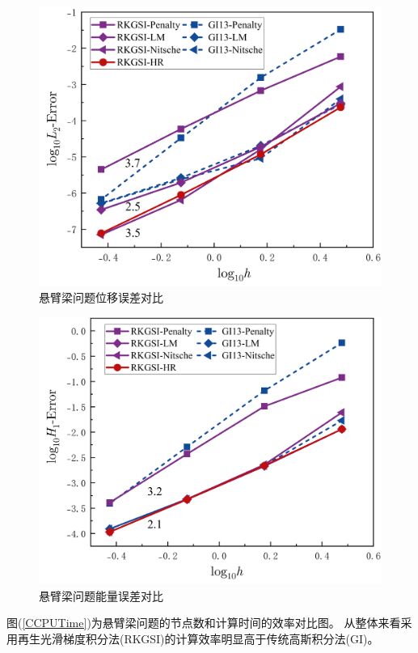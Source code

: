 \begin{figure}[!h]
    \centering
    \includegraphics[scale=0.5]{figure/cantilever/L2.png}
    \caption{悬臂梁问题位移误差对比}\label{CL2}
\end{figure}
\begin{figure}[!h]
    \centering
    \includegraphics[scale=0.5]{figure/cantilever/H1.png}
    \caption{悬臂梁问题能量误差对比}\label{CH1}
\end{figure}\newpage
图(\ref{CCPUTime})为悬臂梁问题的节点数和计算时间的效率对比图。
从整体来看采用再生光滑梯度积分法(RKGSI)的计算效率明显高于传统高斯积分法(GI)。\par
